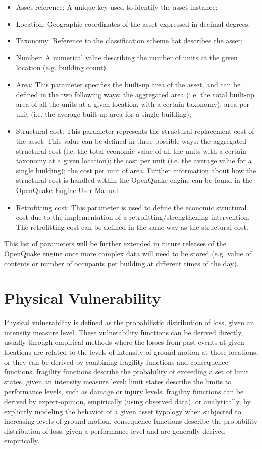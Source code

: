 \begin{itemize}
\item Asset reference: A unique key used to identify the \gls{asset} instance;
\item Location: Geographic coordinates of the \gls{asset} expressed in decimal degrees;
\item Taxonomy: Reference to the classification scheme hat describes the \gls{asset};
\item Number: A numerical value describing the number of units at the given location (e.g. building count).
\item Area: This parameter specifies the built-up area of the asset, and can be defined in the two following ways: the aggregated area (i.e. the total built-up area of all the units at a given location, with a certain \gls{taxonomy}); area per unit (i.e. the average built-up area for a single building);
\item Structural cost: This parameter represents the structural replacement cost of the \gls{asset}. This value can be defined in three possible ways: the aggregated structural cost (i.e. the total economic value of all the units with a certain \gls{taxonomy} at a given location); the cost per unit (i.e. the average value for a single building); the cost per unit of area. Further information about how the structural cost is handled within the OpenQuake engine can be found in the OpenQuake Engine User Manual.
\item Retrofitting cost: This parameter is used to define the economic structural cost due to the implementation of a retrofitting/strengthening intervention. The retrofitting cost can be defined in the same way as the structural cost.
\end{itemize}

This list of parameters will be further extended in future releases of the OpenQuake engine once more complex data will need to be stored (e.g. value of contents or number of occupants per building at different times of the day).

\section{Physical Vulnerability}
Physical vulnerability is defined as the probabilistic distribution of loss, given an intensity measure level. These \glspl{vulnerability function} can be derived directly, usually through empirical methods where the losses from past events at given locations are related to the levels of intensity of ground motion at those locations, or they can be derived by combining \glspl{fragility function} and \glspl{consequence function}. \Glspl{fragility function} describe the probability of exceeding a set of limit states, given an intensity measure level; limit states describe the limits to performance levels, such as damage or injury levels. \Glspl{fragility function} can be derived by expert-opinion, empirically (using observed data), or analytically, by explicitly modeling the behavior of a given asset typology when subjected to increasing levels of ground motion. \Glspl{consequence function} describe the probability distribution of loss, given a performance level and are generally derived empirically. 

